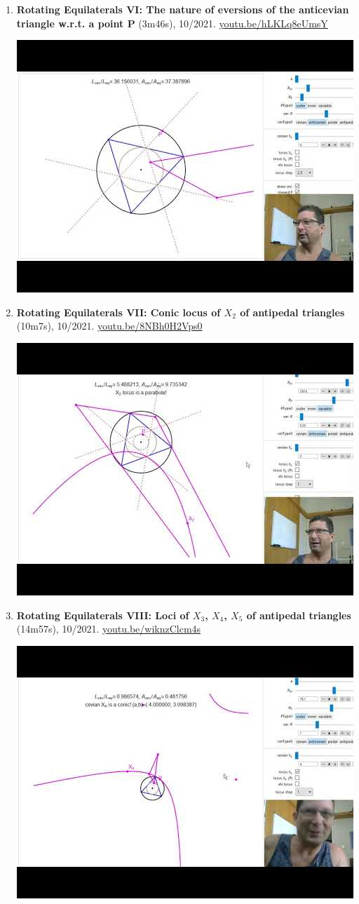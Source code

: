 \documentclass[12pt]{article}
\begin{document}
\begin{enumerate}[resume]
% 
\item \textbf{Rotating Equilaterals VI: The nature of eversions of the anticevian triangle w.r.t. a point P} (3m46s), 10/2021. \href{https://youtu.be/hLKLq8eUmsY}{\url{youtu.be/hLKLq8eUmsY}}
\begin{center}\includegraphics[width=.5\textwidth]{pics/hLKLq8eUmsY.jpg}\end{center}
% 
\item \textbf{Rotating Equilaterals VII: Conic locus of $X_{2}$ of antipedal triangles} (10m7s), 10/2021. \href{https://youtu.be/8NBh0H2Vps0}{\url{youtu.be/8NBh0H2Vps0}}
\begin{center}\includegraphics[width=.5\textwidth]{pics/8NBh0H2Vps0.jpg}\end{center}
% 
\item \textbf{Rotating Equilaterals VIII: Loci of $X_{3}$, $X_{4}$, $X_{5}$ of antipedal triangles} (14m57s), 10/2021. \href{https://youtu.be/wiknzClcm4s}{\url{youtu.be/wiknzClcm4s}}
\begin{center}\includegraphics[width=.5\textwidth]{pics/wiknzClcm4s.jpg}\end{center}

\end{enumerate}
\end{document}
